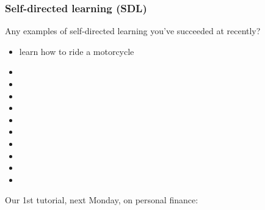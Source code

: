 \begin{frame}\frametitle{Self-directed learning (SDL)}
	Any examples of self-directed learning you've succeeded at recently?
	\begin{itemize}
		\item	learn how to ride a motorcycle
		\item	\iftoggle{instructor}{how to fix drywall}{}
		\item	\iftoggle{instructor}{change your car's oil}{}		
		\item	\iftoggle{instructor}{fix plumbing in your apartment}{}
		\item	\iftoggle{instructor}{cook an ethnic food dish to impress your date/partner}{}
		\item	\iftoggle{instructor}{something learned during your co-op work term?}{}
		\item	\iftoggle{instructor}{going through process of buying a car or a house}{}
		\item	\iftoggle{instructor}{plant, grow and maintain your own vegetables}{}
		\item	\iftoggle{instructor}{learn a new language for travel/pleasure}{}
		\item	\iftoggle{instructor}{start your own company and run it: what is required?}{}
		\item	\iftoggle{instructor}{figure out if I'm better off buying a new car or a used car?}{}
	\end{itemize}
	\vspace{12pt}
	Our 1st tutorial, next Monday, on personal finance: {\small \color{myOrange}{completely SDL}}
\end{frame}

